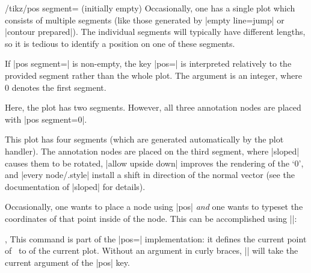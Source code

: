 {\begin{key}{/tikz/pos segment= (initially empty)}
	Occasionally, one has a single plot which consists of multiple segments (like those generated by |empty line=jump| or |contour prepared|). The individual segments will typically have different lengths, so it is tedious to identify a position on one of these segments.

	If |pos segment=| is non-empty, the key |pos=| is interpreted relatively to the provided segment rather than the whole plot. The argument  is an integer, where $0$ denotes the first segment.
\begin{codeexample}[]
\end{codeexample}
	Here, the plot has two segments. However, all three annotation nodes are placed with |pos segment=0|.

\pgfplotsexpensiveexample
\begin{codeexample}[]
\end{codeexample}
	This plot has four segments (which are generated automatically by the plot handler). The annotation nodes are placed
	on the third segment, where |sloped| causes them to be rotated, |allow upside down| improves the rendering of the `$0$', and |every node/.style| install a shift in direction of the normal vector (see the documentation of |sloped| for details).
\end{key}

Occasionally, one wants to place a node using |pos| \emph{and} one wants to typeset the coordinates of that point inside of the node. This can be accomplished using |\pgfplotspointplotattime|:
\begin{commandlist}{\pgfplotspointplotattime,\pgfplotspointplotattime{}}
	This command is part of the |pos=| implementation: it defines the current point of \pgfname\ to  of the current plot. Without an argument in curly braces, |\pgfplotspointplotattime| will take the current argument of the |pos| key.


\end{commandlist}}
